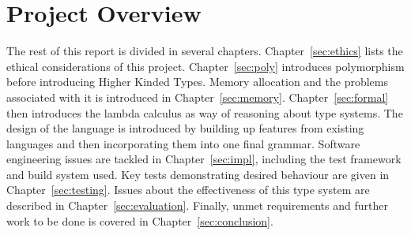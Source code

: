 \section{Project Overview}
The rest of this report is divided in several chapters.
Chapter~\ref{sec:ethics} lists the ethical considerations of this project.
Chapter~\ref{sec:poly} introduces polymorphism before introducing Higher Kinded
Types. Memory allocation and the problems associated with it is introduced in
Chapter~\ref{sec:memory}.  Chapter~\ref{sec:formal} then introduces the lambda
calculus as way of reasoning about type systems. The design of the language is
introduced by building up features from existing languages and then
incorporating them into one final grammar.  
Software engineering issues are tackled in Chapter~\ref{sec:impl}, including
the test framework and build system used. Key tests demonstrating desired
behaviour are given in Chapter~\ref{sec:testing}. Issues about the
effectiveness of this type system are described in
Chapter~\ref{sec:evaluation}. Finally, unmet requirements and further work to
be done is covered in Chapter~\ref{sec:conclusion}.
